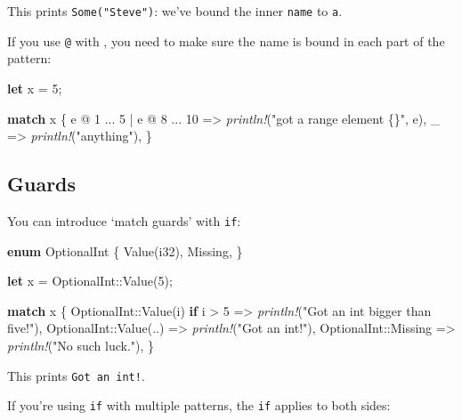 \documentclass[a4paper,]{book}
\newenvironment{Shaded}{\begin{snugshade}}{\end{snugshade}}
\newcommand{\KeywordTok}[1]{\textcolor[rgb]{0.13,0.29,0.53}{\textbf{{#1}}}}
\newcommand{\DataTypeTok}[1]{\textcolor[rgb]{0.13,0.29,0.53}{{#1}}}
\newcommand{\DecValTok}[1]{\textcolor[rgb]{0.00,0.00,0.81}{{#1}}}
\newcommand{\StringTok}[1]{\textcolor[rgb]{0.31,0.60,0.02}{{#1}}}
\newcommand{\PreprocessorTok}[1]{\textcolor[rgb]{0.56,0.35,0.01}{\textit{{#1}}}}
\newcommand{\NormalTok}[1]{{#1}}
\begin{document}
This prints \texttt{Some("Steve")}: we've bound the inner \texttt{name}
to \texttt{a}.

If you use \texttt{@} with \texttt{\textbar{}}, you need to make sure
the name is bound in each part of the pattern:

\begin{Shaded}
\begin{Highlighting}[]
\KeywordTok{let} \NormalTok{x = }\DecValTok{5}\NormalTok{;}

\KeywordTok{match} \NormalTok{x \{}
    \NormalTok{e @ }\DecValTok{1} \NormalTok{... }\DecValTok{5} \NormalTok{| e @ }\DecValTok{8} \NormalTok{... }\DecValTok{10} \NormalTok{=> }\PreprocessorTok{println!}\NormalTok{(}\StringTok{"got a range element \{\}"}\NormalTok{, e),}
    \NormalTok{_ => }\PreprocessorTok{println!}\NormalTok{(}\StringTok{"anything"}\NormalTok{),}
\NormalTok{\}}
\end{Highlighting}
\end{Shaded}

\subsection{Guards}\label{guards}

You can introduce `match guards' with \texttt{if}:

\begin{Shaded}
\begin{Highlighting}[]
\KeywordTok{enum} \NormalTok{OptionalInt \{}
    \NormalTok{Value(}\DataTypeTok{i32}\NormalTok{),}
    \NormalTok{Missing,}
\NormalTok{\}}

\KeywordTok{let} \NormalTok{x = OptionalInt::Value(}\DecValTok{5}\NormalTok{);}

\KeywordTok{match} \NormalTok{x \{}
    \NormalTok{OptionalInt::Value(i) }\KeywordTok{if} \NormalTok{i > }\DecValTok{5} \NormalTok{=> }\PreprocessorTok{println!}\NormalTok{(}\StringTok{"Got an int bigger than five!"}\NormalTok{),}
    \NormalTok{OptionalInt::Value(..) => }\PreprocessorTok{println!}\NormalTok{(}\StringTok{"Got an int!"}\NormalTok{),}
    \NormalTok{OptionalInt::Missing => }\PreprocessorTok{println!}\NormalTok{(}\StringTok{"No such luck."}\NormalTok{),}
\NormalTok{\}}
\end{Highlighting}
\end{Shaded}

This prints \texttt{Got\ an\ int!}.

If you're using \texttt{if} with multiple patterns, the \texttt{if}
applies to both sides:
\end{document}

